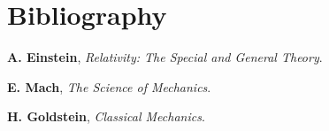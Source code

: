 \documentclass[12pt]{article}
\begin{document}
\bigskip

{\centering\section*{Bibliography}}

\par \textbf{A. Einstein}, \textit{Relativity: The Special and General Theory}.
\medskip
\par \textbf{E. Mach}, \textit{The Science of Mechanics}.
\medskip
\par \textbf{H. Goldstein}, \textit{Classical Mechanics}.
\end{document}
